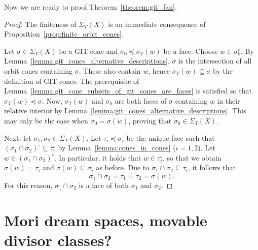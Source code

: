 Now we are ready to proof Theorem~\ref{theorem:git_fan}.
\begin{proof}
	The finiteness of $\Sigma_T(X)$ is an immediate consequence of Proposition~\ref{prop:finite_orbit_cones}. 
	
	Let $\sigma\in\Sigma_T(X)$ be a GIT cone and $\sigma_0\preceq\sigma_T(w)$ be a face. Choose $w\in\sigma_0^\circ$. By Lemma~\ref{lemma:git_cones_alternative_descriptions}, $\sigma$ is the intersection of all orbit cones containing $\sigma$. These also contain $w$, hence $\sigma_T(w)\subseteq \sigma$ by the definition of GIT cones. The prerequisite of Lemma~\ref{lemma:git_cone_subsets_of_git_cones_are_faces} is satisfied so that $\sigma_T(w)\preceq \sigma$. Now, $\sigma_T(w)$ and $\sigma_0$ are both faces of $\sigma$ containing $w$ in their relative interior by Lemma~\ref{lemma:git_cones_alternative_descriptions}. This may only be the case when $\sigma_0 = \sigma(w)$, proving that $\sigma_0\in\Sigma_T(X)$.
	
	Next, let $\sigma_1,\sigma_2\in\Sigma_T(X)$. Let $\tau_i\preceq\sigma_i$ be the unique face such that $(\sigma_1\cap\sigma_2)^\circ \subseteq \tau_i^\circ$ by Lemma~\ref{lemma:cones_in_cones} ($i=1,2$). Let $w\in(\sigma_1\cap\sigma_2)^\circ$. In particular, it holds that $w\in\tau_i^\circ$, so that we obtain $\sigma(w) = \tau_i$ and $\sigma(w)\subseteq \sigma_i$ as before. Due to $\sigma_1 \cap \sigma_2 \subseteq \tau_i$, it follows that 
	$$\sigma_1 \cap \sigma_2 = \tau_1 = \tau_2 = \sigma(w).$$
	For this reason, $\sigma_1 \cap \sigma_2$ is a face of both $\sigma_1$ and $\sigma_2$.
\end{proof}

\section{Mori dream spaces, movable divisor classes?}